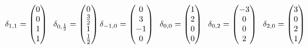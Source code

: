 \documentclass[12pt]{amsart}
\begin{document}
\[
\delta_{1,1} = 
\begin{pmatrix}
0 \\
0 \\
1 \\
1
\end{pmatrix} \hspace{2mm}
\delta_{0,\frac{1}{2}} = 
\begin{pmatrix}
0 \\
\frac{3}{2} \\
1 \\
\frac{1}{2} 
\end{pmatrix}
\delta_{-1,0} = 
\begin{pmatrix}
0 \\
3 \\
-1 \\
0
\end{pmatrix} \hspace{2mm}
\delta_{0,0} = 
\begin{pmatrix}
1 \\
2 \\
0 \\
0
\end{pmatrix} \hspace{2mm}
\delta_{0,2} = 
\begin{pmatrix}
-3 \\
0 \\
0 \\
2
\end{pmatrix} \hspace{2mm}
\delta_{2,0} = 
\begin{pmatrix}
3 \\
0 \\
2 \\
1
\end{pmatrix} \hspace{2mm}
\]
\end{document}
